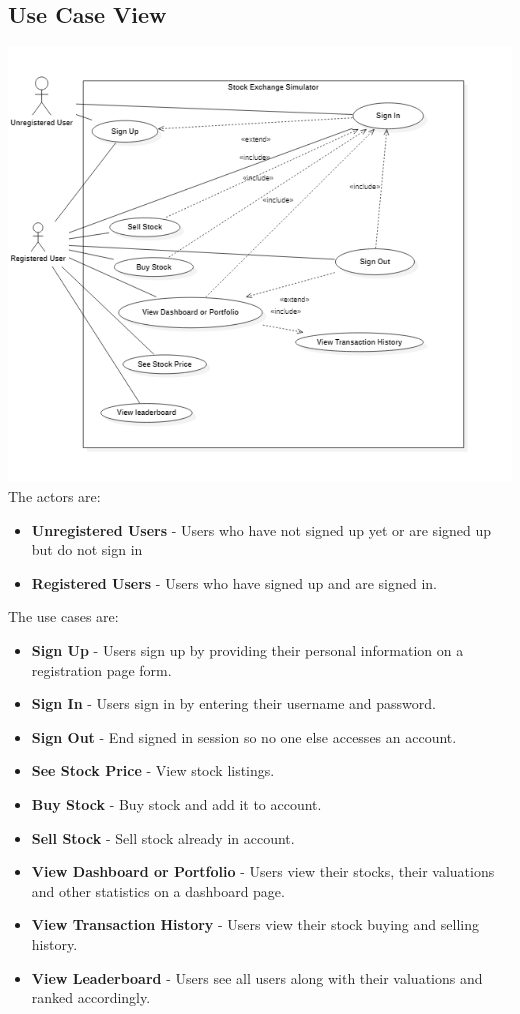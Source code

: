 \documentclass[12 pt, a4paper]{report}
\begin{document}
	\subsection {Use Case View}

\includegraphics{usecase}
The actors are:
\begin{itemize}
\item \textbf{Unregistered Users} - Users who have not signed up yet or are signed up but do not sign in
\item \textbf{Registered Users} - Users who have signed up and are signed in.
\end{itemize}

The use cases are:
\begin{itemize}
\item \textbf{Sign Up} - Users sign up by providing their personal information on a registration page form.
\item \textbf{Sign In} - Users sign in by entering their username and password.
\item \textbf{Sign Out} - End signed in session so no one else accesses an account.
\item \textbf{See Stock Price} - View stock listings.
\item \textbf{Buy Stock} - Buy stock and add it to account.
\item \textbf{Sell Stock} - Sell stock already in account.
\item \textbf{View Dashboard or Portfolio} - Users view their stocks, their valuations and other statistics on a dashboard page.
\item \textbf{View Transaction History} - Users view their stock buying and selling history.
\item \textbf{View Leaderboard} - Users see all users along with their valuations and ranked accordingly.
\end{itemize}
	
\end{document}
